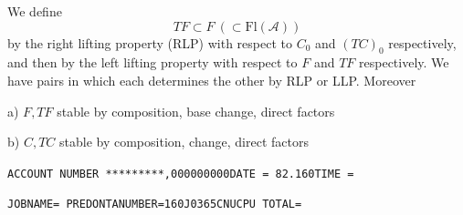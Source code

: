 We define 
\[
TF\subset F\ (\subset\mathrm{Fl}(\mathcal A))
\]
by the right lifting property (RLP) with respect to  $C_0$ and $(TC)_0$ respectively, and then
by the  left lifting property  with respect to $F$ and $TF$ respectively. We have pairs
in which each  determines the other by RLP  or LLP.  Moreover

a) $F,TF$ stable by composition, base change, direct factors

b) $C,TC$ stable by composition,  change, direct factors

\texttt{ACCOUNT NUMBER *********,000000000\quad DATE = 82.160\quad TIME =}

\texttt{JOBNAME= PREDONTA\quad NUMBER=160J0365CNU\quad CPU TOTAL=}


